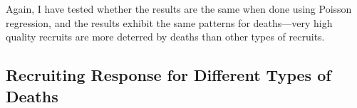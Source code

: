 \documentclass[12pt] {article}
\begin{document}
Again, I have tested whether the results are the same when done using Poisson regression, and the results exhibit the same patterns for deaths---very high quality recruits are more deterred by deaths than other types of recruits.


\subsection{Recruiting Response for Different Types of Deaths\label{sub:Different Death Types}}
\end{document}
